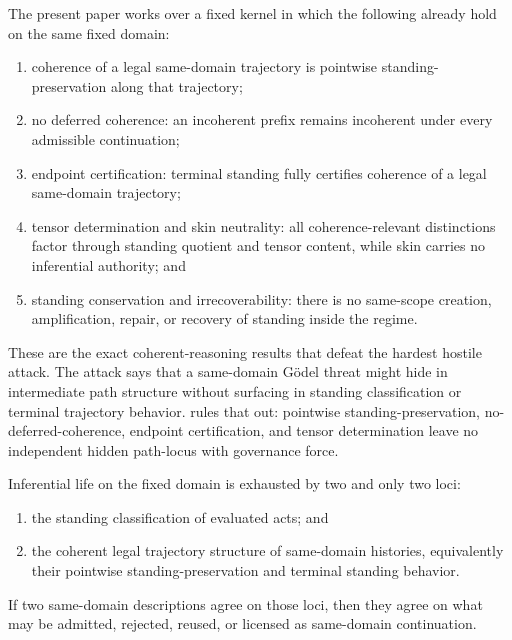 \begin{proposition}
\label{prop:kernel-record}
The present paper works over a fixed kernel in which the following already hold on the same fixed domain:
\begin{enumerate}[label=(K\arabic*), leftmargin=2.8em]
    \item coherence of a legal same-domain trajectory is pointwise standing-preservation along that trajectory;
    \item no deferred coherence: an incoherent prefix remains incoherent under every admissible continuation;
    \item endpoint certification: terminal standing fully certifies coherence of a legal same-domain trajectory;
    \item tensor determination and skin neutrality: all coherence-relevant distinctions factor through standing quotient and tensor content, while skin carries no inferential authority; and
    \item standing conservation and irrecoverability: there is no same-scope creation, amplification, repair, or recovery of standing inside the regime.
\end{enumerate}
\end{proposition}

\begin{remark}
These are the exact coherent-reasoning results that defeat the hardest hostile attack. The attack says that a same-domain G\"odel threat might hide in intermediate path structure without surfacing in standing classification or terminal trajectory behavior.  rules that out: pointwise standing-preservation, no-deferred-coherence, endpoint certification, and tensor determination leave no independent hidden path-locus with governance force.
\end{remark}

\begin{lemma}
\label{lem:inferential-life-exhaustion}
Inferential life on the fixed domain is exhausted by two and only two loci:
\begin{enumerate}[label=(\roman*), leftmargin=2.5em]
    \item the standing classification of evaluated acts; and
    \item the coherent legal trajectory structure of same-domain histories, equivalently their pointwise standing-preservation and terminal standing behavior.
\end{enumerate}
If two same-domain descriptions agree on those loci, then they agree on what may be admitted, rejected, reused, or licensed as same-domain continuation.
\end{lemma}

